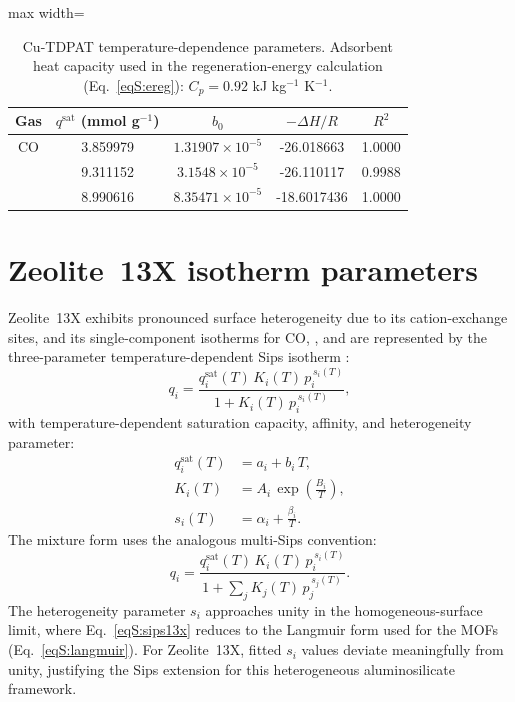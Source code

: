 \documentclass[11pt,a4paper]{article}
\newcommand{\COtwo}{\ce{CO2}}
\newcommand{\CHfour}{\ce{CH4}}
\begin{document}
\begin{table}[htbp]
\centering
\caption{Cu-TDPAT temperature-dependence parameters. Adsorbent heat capacity
used in the regeneration-energy calculation (Eq.~\eqref{eqS:ereg}):
$C_p = 0.92$ kJ kg$^{-1}$ K$^{-1}$.}
\label{tabS:cutdpatarr}
\small
\begin{adjustbox}{max width=\textwidth}
\begin{tabular}{ccccc}
\toprule
Gas & $q^{\mathrm{sat}}$ (mmol g$^{-1}$) & $b_0$ & $-\Delta H/R$ & $R^2$ \\
\midrule
CO       & 3.859979 & $1.31907\times10^{-5}$ & -26.018663 & 1.0000 \\
\COtwo{} & 9.311152 & $3.1548\times10^{-5}$  & -26.110117 & 0.9988 \\
\CHfour{} & 8.990616 & $8.35471\times10^{-5}$ & -18.6017436 & 1.0000 \\
\bottomrule
\end{tabular}
\end{adjustbox}
\end{table}

\FloatBarrier
\section{Zeolite~13X isotherm parameters}
\label{secS:zeolite13x}

Zeolite~13X exhibits pronounced surface heterogeneity due to its
cation-exchange sites, and its single-component isotherms for CO,
\COtwo{}, and \CHfour{} are represented by the three-parameter
temperature-dependent Sips isotherm \citep{Ruthven1984PSA}:
\begin{equation}
q_i = \frac{q_i^{\mathrm{sat}}(T) \, K_i(T) \, p_i^{\,s_i(T)}}
     {1 + K_i(T) \, p_i^{\,s_i(T)}},
\label{eqS:sips13x}
\end{equation}
with temperature-dependent saturation capacity, affinity, and
heterogeneity parameter:
\begin{align}
q_i^{\mathrm{sat}}(T) &= a_i + b_i \, T, \label{eqS:sipsqsat}\\
K_i(T) &= A_i \, \exp\!\left(\frac{B_i}{T}\right), \label{eqS:sipsK}\\
s_i(T) &= \alpha_i + \frac{\beta_i}{T}. \label{eqS:sipss}
\end{align}
The mixture form uses the analogous multi-Sips convention:
\begin{equation}
q_i = \frac{q_i^{\mathrm{sat}}(T) \, K_i(T) \, p_i^{\,s_i(T)}}
     {1 + \sum_j K_j(T) \, p_j^{\,s_j(T)}}.
\label{eqS:sips_mixture}
\end{equation}
The heterogeneity parameter $s_i$ approaches unity in the homogeneous-surface
limit, where Eq.~\eqref{eqS:sips13x} reduces to the Langmuir form used for
the MOFs (Eq.~\eqref{eqS:langmuir}). For Zeolite~13X, fitted $s_i$ values
deviate meaningfully from unity, justifying the Sips extension for this
heterogeneous aluminosilicate framework.
\end{document}
